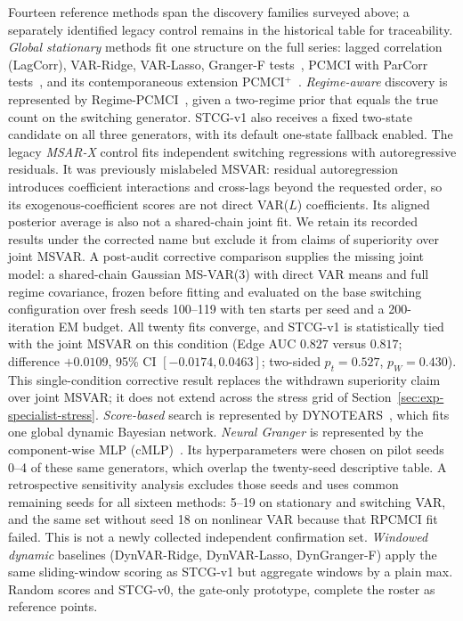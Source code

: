 \documentclass[sigconf,anonymous]{acmart}
\begin{document}
Fourteen reference methods span the discovery families surveyed above; a separately identified legacy control remains in the historical table for traceability.
\emph{Global stationary} methods fit one structure on the full series: lagged correlation (LagCorr), VAR-Ridge, VAR-Lasso, Granger-F tests~\cite{granger1969investigating}, PCMCI with ParCorr tests~\cite{runge2019detecting}, and its contemporaneous extension PCMCI$^+$~\cite{runge2020pcmciplus}.
\emph{Regime-aware} discovery is represented by Regime-PCMCI~\cite{saggioro2020regime}, given a two-regime prior that equals the true count on the switching generator. STCG-v1 also receives a fixed two-state candidate on all three generators, with its default one-state fallback enabled.
The legacy \emph{MSAR-X} control fits independent switching regressions with autoregressive residuals. It was previously mislabeled MSVAR: residual autoregression introduces coefficient interactions and cross-lags beyond the requested order, so its exogenous-coefficient scores are not direct VAR($L$) coefficients. Its aligned posterior average is also not a shared-chain joint fit. We retain its recorded results under the corrected name but exclude it from claims of superiority over joint MSVAR.
A post-audit corrective comparison supplies the missing joint model: a shared-chain Gaussian MS-VAR(3) with direct VAR means and full regime covariance, frozen before fitting and evaluated on the base switching configuration over fresh seeds 100--119 with ten starts per seed and a 200-iteration EM budget.
All twenty fits converge, and STCG-v1 is statistically tied with the joint MSVAR on this condition (Edge AUC $0.827$ versus $0.817$; difference $+0.0109$, 95\% CI $[-0.0174, 0.0463]$; two-sided $p_t=0.527$, $p_W=0.430$).
This single-condition corrective result replaces the withdrawn superiority claim over joint MSVAR; it does not extend across the stress grid of Section~\ref{sec:exp-specialist-stress}.
\emph{Score-based} search is represented by DYNOTEARS~\cite{pamfil2020dynotears}, which fits one global dynamic Bayesian network.
\emph{Neural Granger} is represented by the component-wise MLP (cMLP)~\cite{tank2021neural}.
Its hyperparameters were chosen on pilot seeds 0--4 of these same generators, which overlap the twenty-seed descriptive table. A retrospective sensitivity analysis excludes those seeds and uses common remaining seeds for all sixteen methods: 5--19 on stationary and switching VAR, and the same set without seed 18 on nonlinear VAR because that RPCMCI fit failed. This is not a newly collected independent confirmation set.
\emph{Windowed dynamic} baselines (DynVAR-Ridge, DynVAR-Lasso, DynGranger-F) apply the same sliding-window scoring as STCG-v1 but aggregate windows by a plain max.
Random scores and STCG-v0, the gate-only prototype, complete the roster as reference points.
\end{document}
